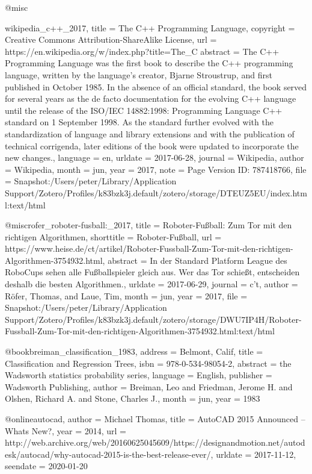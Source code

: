 {{@misc{wikipedia_c++_2017,
  title     = {The {C}++ {Programming} {Language}},
  copyright = {Creative Commons Attribution-ShareAlike License},
  url       = {https://en.wikipedia.org/w/index.php?title=The_C%
  abstract  = {The C++ Programming Language was the first book to describe the C++ programming language, written by the language{\textquoteright}s creator, Bjarne Stroustrup, and first published in October 1985. In the absence of an official standard, the book served for several years as the de facto documentation for the evolving C++ language until the release of the ISO/IEC 14882:1998: Programming Language C++ standard on 1 September 1998. As the standard further evolved with the standardization of language and library extensions and with the publication of technical corrigenda, later editions of the book were updated to incorporate the new changes.},
  language  = {en},
  urldate   = {2017-06-28},
  journal   = {Wikipedia},
  author    = {{Wikipedia}},
  month     = jun,
  year      = {2017},
  note      = {Page Version ID: 787418766},
  file      = {Snapshot:/Users/peter/Library/Application Support/Zotero/Profiles/k83bzk3j.default/zotero/storage/DTEUZ5EU/index.html:text/html}
}

@misc{rofer_roboter-fusball:_2017,
  title      = {Roboter-{Fu{\ss}ball}: {Zum} {Tor} mit den richtigen {Algorithmen}},
  shorttitle = {Roboter-{Fu{\ss}ball}},
  url        = {https://www.heise.de/ct/artikel/Roboter-Fussball-Zum-Tor-mit-den-richtigen-Algorithmen-3754932.html},
  abstract   = {In der Standard Platform League des RoboCups sehen alle Fu{\ss}ballspieler gleich aus. Wer das Tor schie{\ss}t, entscheiden deshalb die besten Algorithmen.},
  urldate    = {2017-06-29},
  journal    = {c't},
  author     = {R{\"o}fer, Thomas,  and Laue, Tim},
  month      = jun,
  year       = {2017},
  file       = {Snapshot:/Users/peter/Library/Application Support/Zotero/Profiles/k83bzk3j.default/zotero/storage/DWU7IP4H/Roboter-Fussball-Zum-Tor-mit-den-richtigen-Algorithmen-3754932.html:text/html}
}

@book{breiman_classification_1983,
  address   = {Belmont, Calif},
  title     = {Classification and {Regression} {Trees}},
  isbn      = {978-0-534-98054-2},
  abstract  = {the Wadsworth statistics probability series},
  language  = {English},
  publisher = {Wadsworth Publishing},
  author    = {Breiman, Leo and Friedman, Jerome H. and Olshen, Richard A. and Stone, Charles J.},
  month     = jun,
  year      = {1983}
}

@online{autocad,
  author   = {Michael Thomas},
  title    = {AutoCAD 2015 Announced – Whats New?},
  year     = 2014,
  url      = {http://web.archive.org/web/20160625045609/https://designandmotion.net/autodesk/autocad/why-autocad-2015-is-the-best-release-ever/},
  urldate  = {2017-11-12},
  seendate = {2020-01-20}
}


}}}
